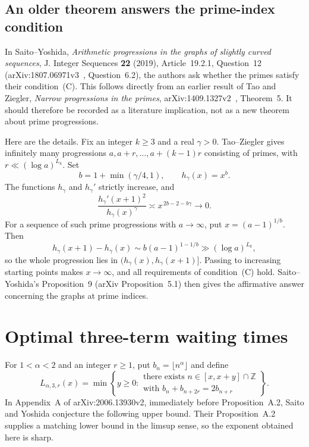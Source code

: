 \documentclass[11pt,a4paper]{article}
\theoremstyle{definition}
\theoremstyle{remark}
\numberwithin{equation}{section}
\begin{document}
\subsection{An older theorem answers the prime-index condition}

In Saito--Yoshida, \emph{Arithmetic progressions in the graphs of
slightly curved sequences}, J. Integer Sequences \textbf{22} (2019),
Article~19.2.1, Question~12 (arXiv:1807.06971v3~\cite{SaitoYoshidaCurved2019}, Question~6.2), the
authors ask whether the primes satisfy their condition~(C).
This follows directly from an earlier result of Tao and Ziegler,
\emph{Narrow progressions in the primes}, arXiv:1409.1327v2~\cite{TaoZiegler2014},
Theorem~5. It should therefore be recorded as a literature implication,
not as a new theorem about prime progressions.

Here are the details. Fix an integer $k\geq3$ and a real $\gamma>0$.
Tao--Ziegler gives infinitely many progressions
$a,a+r,\ldots,a+(k-1)r$ consisting of primes, with
$r\ll(\log a)^{L_k}$. Set
\[
 b=1+\min(\gamma/4,1),\qquad h_\gamma(x)=x^b.
\]
The functions $h_\gamma$ and $h_\gamma'$ strictly increase, and
\[
 \frac{h_\gamma'(x+1)^2}{h_\gamma(x)^\gamma}
 \asymp x^{\,2b-2-b\gamma}\longrightarrow0.
\]
For a sequence of such prime progressions with $a\to\infty$, put
$x=(a-1)^{1/b}$. Then
\[
 h_\gamma(x+1)-h_\gamma(x)
 \sim b(a-1)^{1-1/b}
 \gg (\log a)^{L_k},
\]
so the whole progression lies in
$(h_\gamma(x),h_\gamma(x+1)]$. Passing to increasing starting points
makes $x\to\infty$, and all requirements of condition~(C) hold.
Saito--Yoshida's Proposition~9 (arXiv Proposition~5.1) then gives the
affirmative answer concerning the graphs at prime indices.

\section{Optimal three-term waiting times}

For $1<\alpha<2$ and an integer $r\geq1$, put $b_n=\lfloor n^\alpha\rfloor$ and define
\[
 L_{\alpha,3,r}(x)=\min\left\{y\geq0:
 \begin{array}{l}
 \text{there exists }n\in[x,x+y]\cap\mathbb Z\\
 \text{with }b_n+b_{n+2r}=2b_{n+r}
 \end{array}\right\}.
\]
In Appendix~A of arXiv:2006.13930v2, immediately before
Proposition~A.2, Saito and Yoshida conjecture the following upper bound.
Their Proposition~A.2 supplies a matching lower bound in the limsup
sense, so the exponent obtained here is sharp.
\end{document}
